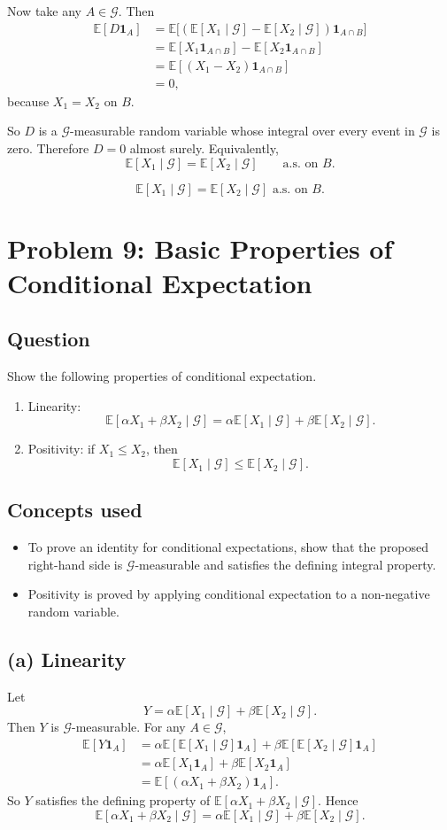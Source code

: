 \documentclass[11pt,a4paper]{article}
\newcommand{\E}{\mathbb{E}}
\newcommand{\1}{\mathbf{1}}
\newcommand{\cG}{\mathcal{G}}
\begin{document}
Now take any $A\in \cG$. Then
\begin{align*}
\E[D\1_A]
&=\E\bigl[(\E[X_1\mid \cG]-\E[X_2\mid \cG])\1_{A\cap B}\bigr]\\
&=\E[X_1\1_{A\cap B}]-\E[X_2\1_{A\cap B}]\\
&=\E[(X_1-X_2)\1_{A\cap B}]\\
&=0,
\end{align*}
because $X_1=X_2$ on $B$.

So $D$ is a $\cG$-measurable random variable whose integral over every event in $\cG$ is zero. Therefore $D=0$ almost surely. Equivalently,
\[
\E[X_1\mid \cG]=\E[X_2\mid \cG]\qquad \text{a.s. on }B.
\]

\[
\boxed{\E[X_1\mid \cG]=\E[X_2\mid \cG]\text{ a.s. on }B.}
\]

\section{Problem 9: Basic Properties of Conditional Expectation}
\subsection*{Question}
Show the following properties of conditional expectation.

\begin{enumerate}[label=\textbf{(\alph*)}]
  \item Linearity:
  \[
  \E[\alpha X_1+\beta X_2\mid \mathcal{G}]
  =
  \alpha \E[X_1\mid \mathcal{G}]+\beta \E[X_2\mid \mathcal{G}].
  \]
  \item Positivity: if $X_1\le X_2$, then
  \[
  \E[X_1\mid \mathcal{G}] \le \E[X_2\mid \mathcal{G}].
  \]
\end{enumerate}

\subsection*{Concepts used}
\begin{itemize}
  \item To prove an identity for conditional expectations, show that the proposed right-hand side is $\cG$-measurable and satisfies the defining integral property.
  \item Positivity is proved by applying conditional expectation to a non-negative random variable.
\end{itemize}

\subsection*{(a) Linearity}
Let
\[
Y=\alpha \E[X_1\mid \cG]+\beta \E[X_2\mid \cG].
\]
Then $Y$ is $\cG$-measurable. For any $A\in \cG$,
\begin{align*}
\E[Y\1_A]
&=\alpha \E[\E[X_1\mid \cG]\1_A]+\beta \E[\E[X_2\mid \cG]\1_A]\\
&=\alpha \E[X_1\1_A]+\beta \E[X_2\1_A]\\
&=\E[(\alpha X_1+\beta X_2)\1_A].
\end{align*}
So $Y$ satisfies the defining property of $\E[\alpha X_1+\beta X_2\mid \cG]$. Hence
\[
\boxed{\E[\alpha X_1+\beta X_2\mid \cG]
=\alpha \E[X_1\mid \cG]+\beta \E[X_2\mid \cG].}
\]
\end{document}

